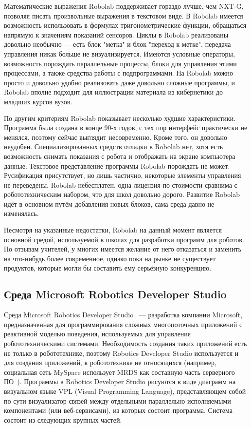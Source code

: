\documentclass[a4paper]{article}
\begin{document}
Математические выражения Robolab поддерживает гораздо лучше, чем NXT-G, позволяя писать произвольные выражения в текстовом виде. В Robolab имеется возможность использовать в формулах тригонометрические функции, обращаться напрямую к значениям показаний сенсоров. Циклы в Robolab реализованы довольно необычно --- есть блок "метка" и блок "переход к метке", передача управления никак больше не визуализируется. Имеются условные операторы, возможность порождать параллельные процессы, блоки для управления этими процессами, а также средства работы с подпрограммами. На Robolab можно просто и довольно удобно реализовать даже довольно сложные программы, и Robolab вполне подходит для иллюстрации материала из кибернетики до младших курсов вузов.

По другим критериям Robolab показывает несколько худшие характеристики. Программа была создана в конце 90-х годов, с тех пор интерфейс практически не менялся, поэтому сейчас выглядит несовременно. Кроме того, он довольно неудобен. Специализированных средств отладки в Robolab нет, хотя есть возможность снимать показания с робота и отображать на экране компьютера данные. Текстовое представление программы Robolab порождать не может. Русификация присутствует, но лишь частично, некоторые элементы управления не переведены. Robolab небесплатен, одна лицензия по стоимости сравнима с робототехническим набором, что для школ довольно дорого. Развитие Robolab идёт в основном путём добавления новых блоков, сама среда давно не изменялась.

Несмотря на указанные недостатки, Robolab на данный момент является основной средой, используемой в школах для разработки программ для роботов. По отзывам учителей, у многих имеется желание от него отказаться и заменить на что-нибудь более современное, однако пока на рынке не существует продуктов, которые могли бы составить ему серьёзную конкуренцию.

\subsection{Среда Microsoft Robotics Developer Studio}
Среда Microsoft Robotics Developer Studio~\cite{mrds} --- разработка компании Microsoft, предназначенная для программирования сложных многопоточных приложений с реактивной моделью поведения, используемых для управления робототехническими системами. Необходимость создания таких приложений есть не только в робототехнике, поэтому Robotics Developer Studio используется и для создания приложений, к робототехнике не относящихся (например, социальная сеть MySpace использует MRDS как составную часть серверного ПО~\cite{mrdsAtMySpace}). Программы в Robotics Developer Studio рисуются в виде диаграмм на визуальном языке VPL (Visual Programming Language), представляющем собой по сути визуализатор связей между отдельными параллельно исполняемыми компонентами (или веб-сервисами), из которых состоит программа. Система состоит из следующих крупных частей.
\end{document}
